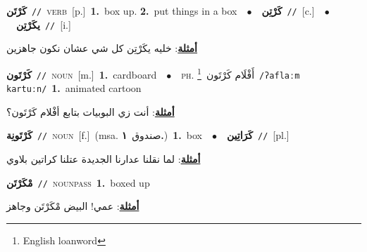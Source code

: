 \documentclass[10pt,a4paper,twoside]{article} %
\begin{document}
\begin{multicols}{2}
{\setlength\topsep{0pt}\textbf{\foreignlanguage{arabic}{كَرْتَن}}\ {\color{gray}\texttt{//}\color{black}}\ \textsc{verb}\ [p.]\ \textbf{1.}~box up.  \textbf{2.}~put things in a box\ \ $\bullet$\ \ \setlength\topsep{0pt}\textbf{\foreignlanguage{arabic}{كَرْتِن}}\ {\color{gray}\texttt{//}\color{black}}\ [c.]\ \ $\bullet$\ \ \setlength\topsep{0pt}\textbf{\foreignlanguage{arabic}{يكَرْتِن}}\ {\color{gray}\texttt{//}\color{black}}\ [i.]\  \begin{flushright}\color{gray}\foreignlanguage{arabic}{\textbf{\underline{\foreignlanguage{arabic}{أمثلة}}}: خليه يكَرْتِن كل شي عشان نكون جاهزين}\end{flushright}\color{black}} \vspace{2mm}

{\setlength\topsep{0pt}\textbf{\foreignlanguage{arabic}{كَرْتَون}}\ {\color{gray}\texttt{//}\color{black}}\ \textsc{noun}\ [m.]\ \textbf{1.}~cardboard\ \ $\bullet$\ \ \textsc{ph.} \color{gray} \foreignlanguage{arabic}{أَفْلَام كَرْتَون}\color{black}\ \footnote{English loanword}\ {\color{gray}\texttt{/{\sffamily ʔaflaːm kartuːn}/}\color{black}}\ \textbf{1.}~animated cartoon\  \begin{flushright}\color{gray}\foreignlanguage{arabic}{\textbf{\underline{\foreignlanguage{arabic}{أمثلة}}}: أنت زي البوبيات بتابع أفْلام كَرْتَون؟}\end{flushright}\color{black}} \vspace{2mm}

{\setlength\topsep{0pt}\textbf{\foreignlanguage{arabic}{كَرْتَونِة}}\ {\color{gray}\texttt{//}\color{black}}\ \textsc{noun}\ [f.]\ \color{gray}(msa. \foreignlanguage{arabic}{صندوق}~\foreignlanguage{arabic}{\textbf{١.}})\color{black}\ \textbf{1.}~box\ \ $\bullet$\ \ \setlength\topsep{0pt}\textbf{\foreignlanguage{arabic}{كَرَاتِين}}\ {\color{gray}\texttt{//}\color{black}}\ [pl.]\  \begin{flushright}\color{gray}\foreignlanguage{arabic}{\textbf{\underline{\foreignlanguage{arabic}{أمثلة}}}: لما نقلنا عدارنا الجديدة عتلنا كراتين بلاوي}\end{flushright}\color{black}} \vspace{2mm}

{\setlength\topsep{0pt}\textbf{\foreignlanguage{arabic}{مْكَرْتَن}}\ {\color{gray}\texttt{//}\color{black}}\ \textsc{noun\textunderscore pass}\ \textbf{1.}~boxed up\  \begin{flushright}\color{gray}\foreignlanguage{arabic}{\textbf{\underline{\foreignlanguage{arabic}{أمثلة}}}: عمي! البيض مْكَرْتَن وجاهز}\end{flushright}\color{black}} \vspace{2mm}


\end{multicols}
\end{document}
